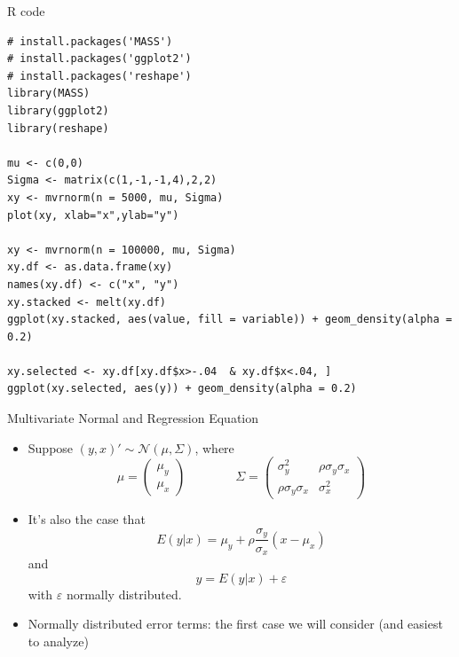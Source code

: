 \documentclass[english,xcolor={dvipsnames},aspectratio=169]{beamer}
\begin{document}


\begin{frame}[fragile]{ R code}
\begin{lstlisting}
# install.packages('MASS')
# install.packages('ggplot2')
# install.packages('reshape')
library(MASS)
library(ggplot2)
library(reshape)

mu <- c(0,0)
Sigma <- matrix(c(1,-1,-1,4),2,2)
xy <- mvrnorm(n = 5000, mu, Sigma)
plot(xy, xlab="x",ylab="y")

xy <- mvrnorm(n = 100000, mu, Sigma)
xy.df <- as.data.frame(xy)
names(xy.df) <- c("x", "y")
xy.stacked <- melt(xy.df)
ggplot(xy.stacked, aes(value, fill = variable)) + geom_density(alpha = 0.2)

xy.selected <- xy.df[xy.df$x>-.04  & xy.df$x<.04, ]
ggplot(xy.selected, aes(y)) + geom_density(alpha = 0.2)
\end{lstlisting}
\end{frame}


\begin{frame}{Multivariate Normal and Regression Equation}
\begin{itemize}

	\item Suppose $\left(y,x\right)' \sim \mathcal{N}\left(\mu,\Sigma\right)$, where \[
\mu=\left(\begin{array}{c}
\mu_{y}\\
\mu_{x}
\end{array}\right)\qquad\qquad\Sigma=\left(\begin{array}{cc}
\sigma_{y}^{2} & \rho\sigma_{y}\sigma_{x}\\
\rho\sigma_{y}\sigma_{x} & \sigma_{x}^{2}
\end{array}\right)
\]

	\smallskip
	\item It's also the case that \[
		E\left(y|x\right) = \mu_y + \rho\frac{\sigma_y}{\sigma_x}\left(x-\mu_x\right)
	\]
	and \[
		y = E\left(y|x\right) + \varepsilon
	\]
	with $\varepsilon$ normally distributed.

	\smallskip
	\item Normally distributed error terms: the first case we will consider (and easiest to analyze)

\end{itemize}
\end{frame}
\end{document}
